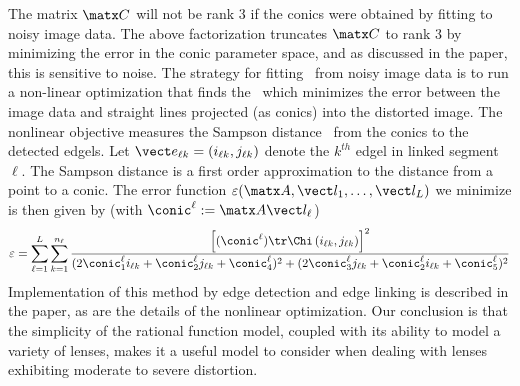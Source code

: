 \documentclass[extendedabs]{bmvc2k}
\begin{document}
The matrix $\matx C$ will not be rank 3 if the conics were obtained by
fitting to noisy image data.  The above factorization truncates $\matx C$
to rank 3 by minimizing the error in the conic parameter space, and as
discussed in the paper, this is sensitive to noise.  The strategy for
fitting \A\ from noisy image data is to run a non-linear optimization that
finds the \A\ which minimizes the error between the image data and straight
lines projected (as conics) into the distorted image.  The nonlinear
objective measures the Sampson distance~\cite{Hartley00} from the conics to
the detected edgels.  Let $\vect e_{\ell k} = (i_{\ell k},j_{\ell k})$
denote the $k^{th}$ edgel in linked segment $\ell$. The Sampson distance is
a first order approximation to the distance from a point to a conic. The
error function $\varepsilon(\matx A, \vect l_1, \ldots, \vect l_L)$ we
minimize is then given by (with $\conic^\ell := \matx A \vect l_\ell$)
\begin{equation}
\def\t#1{\conic^\ell_{#1}}
\varepsilon =
\sum_{\ell = 1}^{L} \sum_{k=1}^{n_\ell }
\frac
{\left[(\conic^\ell)\tr\Chi\left(i_{\ell k},j_{\ell k}\right)\right]^2}
{(2\t1 i_{\ell k} + \t2 j_{\ell k} + \t4)^2 + (2\t3 j_{\ell k} +
\t2 i_{\ell k} + \t5)^2}
\nonumber
\end{equation}
Implementation of this method by edge detection and edge linking is
described in the paper, as are the details of the nonlinear optimization.
Our conclusion is that the simplicity of the rational function model,
coupled with its ability to model a variety of lenses, makes it a useful
model to consider when dealing with lenses exhibiting moderate to severe
distortion.


\end{document}
